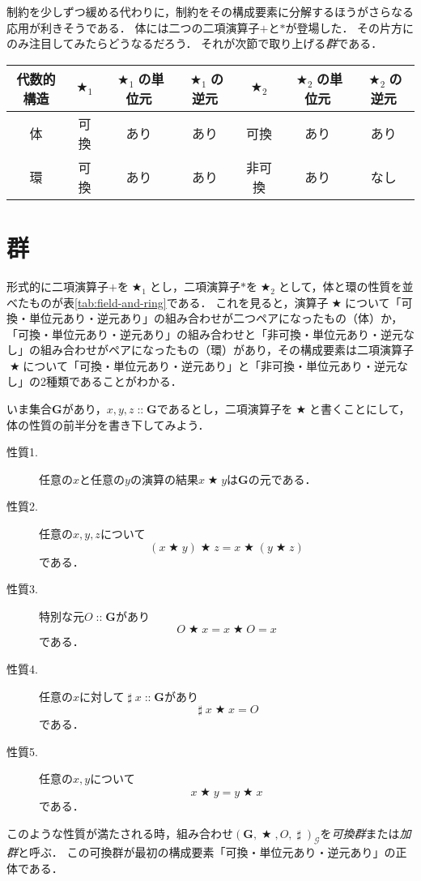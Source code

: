 \documentclass[twocolumn]{jsbook}
\newcommand{\keyword}[1]{\emph{#1}}
\DeclareMathOperator{\mathAnyBinaryOperator}{\bigstar}
\DeclareMathOperator{\mathInverse}{\sharp}
\DeclareMathOperator{\mathIn}{::}
\newcommand{\mathSet}[1]{\mathbf{#1}}
\newcommand{\mathGroup}[4]{(#1,#2,#3,#4)_\mathcal{G}}
\begin{document}
制約を少しずつ緩める代わりに，制約をその構成要素に分解するほうがさらなる応用が利きそうである．
体には二つの二項演算子$+$と$*$が登場した．
その片方にのみ注目してみたらどうなるだろう．
それが次節で取り上げる\keyword{群}である．

\begin{table*}
\caption{代表的な代数的構造の性質(1)}
\label{tab:field-and-ring}
\begin{center}
\begin{tabular}{||c||c|c|c|c|c|c||}
\hline
代数的構造&$\mathAnyBinaryOperator_1$&$\mathAnyBinaryOperator_1$の単位元&$\mathAnyBinaryOperator_1$の逆元&$\mathAnyBinaryOperator_2$&$\mathAnyBinaryOperator_2$の単位元&$\mathAnyBinaryOperator_2$の逆元\\
\hline\hline
体&可換&あり&あり&可換&あり&あり\\
環&可換&あり&あり&非可換&あり&なし\\
\hline
\end{tabular}
\end{center}
\end{table*}

\section{群}

形式的に二項演算子$+$を$\mathAnyBinaryOperator_1$とし，二項演算子$*$を$\mathAnyBinaryOperator_2$として，体と環の性質を並べたものが表\ref{tab:field-and-ring}である．
これを見ると，演算子$\mathAnyBinaryOperator$について「可換・単位元あり・逆元あり」の組み合わせが二つペアになったもの（体）か，「可換・単位元あり・逆元あり」の組み合わせと「非可換・単位元あり・逆元なし」の組み合わせがペアになったもの（環）があり，その構成要素は二項演算子$\mathAnyBinaryOperator$について「可換・単位元あり・逆元あり」と「非可換・単位元あり・逆元なし」の2種類であることがわかる．

いま集合$\mathSet{G}$があり，$x,y,z\mathIn\mathSet{G}$であるとし，二項演算子を$\mathAnyBinaryOperator$と書くことにして，体の性質の前半分を書き下してみよう．
\begin{description}
\item[性質1.] 任意の$x$と任意の$y$の演算の結果$x\mathAnyBinaryOperator y$は$\mathSet{G}$の元である．
\item[性質2.] 任意の$x,y,z$について$$(x\mathAnyBinaryOperator y)\mathAnyBinaryOperator z=x\mathAnyBinaryOperator(y\mathAnyBinaryOperator z)$$である．
\item[性質3.] 特別な元$O\mathIn\mathSet{G}$があり$$O\mathAnyBinaryOperator x=x\mathAnyBinaryOperator O=x$$である．
\item[性質4.] 任意の$x$に対して$\mathInverse x\mathIn\mathSet{G}$があり$$\mathInverse x\mathAnyBinaryOperator x=O$$である．
\item[性質5.] 任意の$x,y$について$$x\mathAnyBinaryOperator y=y\mathAnyBinaryOperator x$$である．
\end{description}
このような性質が満たされる時，組み合わせ$\mathGroup{\mathSet{G}}{\mathAnyBinaryOperator}{O}{\mathInverse}$を\keyword{可換群}または\keyword{加群}と呼ぶ．
この可換群が最初の構成要素「可換・単位元あり・逆元あり」の正体である．
\end{document}

